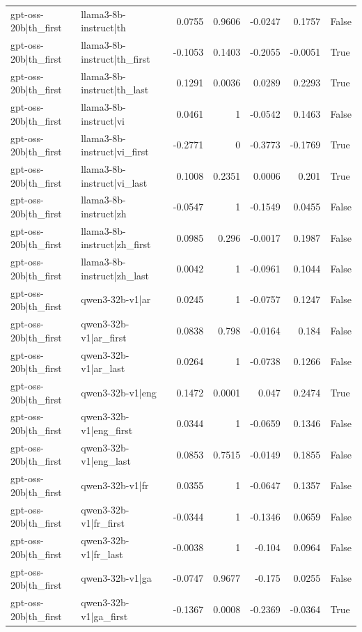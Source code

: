 \begin{table}
\begin{tabular}{l l r r r r l}
gpt-oss-20b|th_first & llama3-8b-instruct|th & 0.0755 & 0.9606 & -0.0247 & 0.1757 & False \\
gpt-oss-20b|th_first & llama3-8b-instruct|th_first & -0.1053 & 0.1403 & -0.2055 & -0.0051 & True \\
gpt-oss-20b|th_first & llama3-8b-instruct|th_last & 0.1291 & 0.0036 & 0.0289 & 0.2293 & True \\
gpt-oss-20b|th_first & llama3-8b-instruct|vi & 0.0461 & 1 & -0.0542 & 0.1463 & False \\
gpt-oss-20b|th_first & llama3-8b-instruct|vi_first & -0.2771 & 0 & -0.3773 & -0.1769 & True \\
gpt-oss-20b|th_first & llama3-8b-instruct|vi_last & 0.1008 & 0.2351 & 0.0006 & 0.201 & True \\
gpt-oss-20b|th_first & llama3-8b-instruct|zh & -0.0547 & 1 & -0.1549 & 0.0455 & False \\
gpt-oss-20b|th_first & llama3-8b-instruct|zh_first & 0.0985 & 0.296 & -0.0017 & 0.1987 & False \\
gpt-oss-20b|th_first & llama3-8b-instruct|zh_last & 0.0042 & 1 & -0.0961 & 0.1044 & False \\
gpt-oss-20b|th_first & qwen3-32b-v1|ar & 0.0245 & 1 & -0.0757 & 0.1247 & False \\
gpt-oss-20b|th_first & qwen3-32b-v1|ar_first & 0.0838 & 0.798 & -0.0164 & 0.184 & False \\
gpt-oss-20b|th_first & qwen3-32b-v1|ar_last & 0.0264 & 1 & -0.0738 & 0.1266 & False \\
gpt-oss-20b|th_first & qwen3-32b-v1|eng & 0.1472 & 0.0001 & 0.047 & 0.2474 & True \\
gpt-oss-20b|th_first & qwen3-32b-v1|eng_first & 0.0344 & 1 & -0.0659 & 0.1346 & False \\
gpt-oss-20b|th_first & qwen3-32b-v1|eng_last & 0.0853 & 0.7515 & -0.0149 & 0.1855 & False \\
gpt-oss-20b|th_first & qwen3-32b-v1|fr & 0.0355 & 1 & -0.0647 & 0.1357 & False \\
gpt-oss-20b|th_first & qwen3-32b-v1|fr_first & -0.0344 & 1 & -0.1346 & 0.0659 & False \\
gpt-oss-20b|th_first & qwen3-32b-v1|fr_last & -0.0038 & 1 & -0.104 & 0.0964 & False \\
gpt-oss-20b|th_first & qwen3-32b-v1|ga & -0.0747 & 0.9677 & -0.175 & 0.0255 & False \\
gpt-oss-20b|th_first & qwen3-32b-v1|ga_first & -0.1367 & 0.0008 & -0.2369 & -0.0364 & True \\

\end{tabular}
\end{table}

